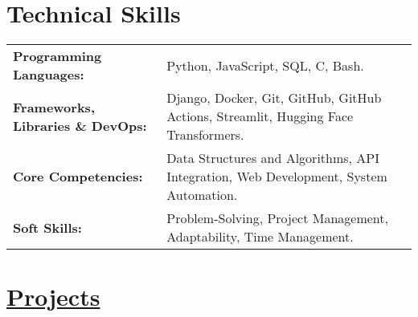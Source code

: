 \documentclass[a4paper,10pt]{article}
\begin{document}
\section{Technical Skills}
\vspace{2.5pt}
\begin{tabularx}{\linewidth}{@{} l X @{}}
    \textbf{Programming Languages:} & Python, JavaScript, SQL, C, Bash. \\
    \vspace{2.5pt}
    \textbf{Frameworks, Libraries \& DevOps:} & Django, Docker, Git, GitHub, GitHub Actions, Streamlit, Hugging Face Transformers. \\
    \vspace{2.5pt}
    \textbf{Core Competencies:} & Data Structures and Algorithms, API Integration, Web Development, System Automation. \\
    \vspace{2.5pt}
    \textbf{Soft Skills:} & Problem-Solving, Project Management, Adaptability, Time Management. \\
\end{tabularx}

\vspace{3pt}


\newcommand{\projectentry}[5]{%
    \noindent\vspace{5pt}
    \textcolor{myblue}{\textbf{\href{#2}{#1}}} \textcolor{mydarkblue}{\href{#3}{\faLink}} \\ \vspace{-10pt}
    \begin{itemize}[left=0pt, label=--, nosep]
        \item \vspace{-10pt}\textbf{Overview:} #4
    \end{itemize}
    \vspace{0pt}%
}


\vspace{-3pt}
\section{\href{https://github.com/deekshith0509?tab=repositories}{Projects}}
\end{document}
